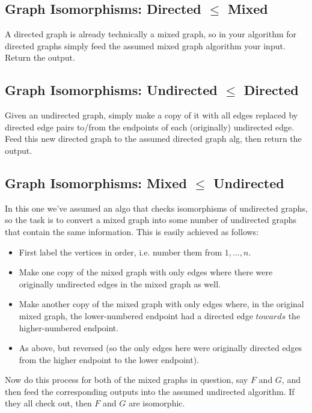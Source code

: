 \documentclass[12pt]{article}
\providecommand{\reducible}[2]{
  \textbf{#1} $\leq$ \textbf{#2}
}
\begin{document}
\subsection{Graph Isomorphisms: \reducible{Directed}{Mixed}}
A directed graph is already technically a mixed graph,
so in your algorithm for directed graphs simply feed the assumed mixed graph algorithm your input.
Return the output.


\subsection{Graph Isomorphisms: \reducible{Undirected}{Directed}}
Given an undirected graph, simply make a copy of it with all edges replaced by
directed edge pairs to/from the endpoints of each (originally) undirected edge.
Feed this new directed graph to the assumed directed graph alg, then return the output.

\subsection{Graph Isomorphisms: \reducible{Mixed}{Undirected}}
In this one we've assumed an algo that checks isomorphisms of undirected graphs,
so the task is to convert a mixed graph into some number of undirected graphs that contain the same information.
This is easily achieved as follows:
\begin{itemize}
  \item First label the vertices in order, i.e. number them from $1,\dots,n$.
  \item Make one copy of the mixed graph with only edges where there were originally undirected edges in the mixed graph as well.
  \item Make another copy of the mixed graph with only edges where, in the original mixed graph, the lower-numbered endpoint had a directed edge $towards$ the higher-numbered endpoint.
  \item As above, but reversed (so the only edges here were originally directed edges from the higher endpoint to the lower endpoint).
\end{itemize}
Now do this process for both of the mixed graphs in question, say $F$ and $G$, and then feed the corresponding outputs into the assumed undirected algorithm. If they all check out, then $F$ and $G$ are isomorphic.
\end{document}
